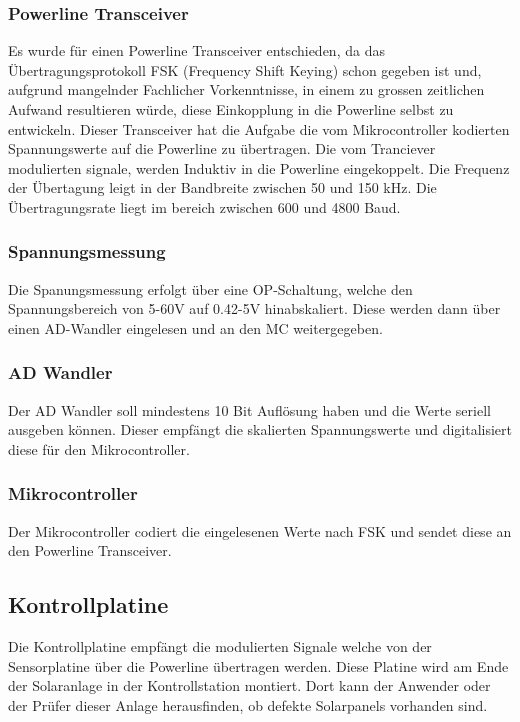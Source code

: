\newpage
\subsubsection{Powerline Transceiver}

Es wurde für einen Powerline Transceiver entschieden, da das Übertragungsprotokoll FSK (Frequency Shift Keying) schon gegeben ist und, aufgrund mangelnder Fachlicher Vorkenntnisse, in einem zu grossen zeitlichen Aufwand resultieren würde, diese Einkopplung in die Powerline selbst zu entwickeln. 
Dieser Transceiver hat die Aufgabe die vom Mikrocontroller kodierten Spannungswerte auf die Powerline zu übertragen. Die vom Tranciever modulierten signale, werden Induktiv in die Powerline eingekoppelt.  Die Frequenz der Übertagung leigt in der Bandbreite zwischen 50 und 150 kHz. Die Übertragungsrate liegt im bereich zwischen 600 und 4800 Baud.

\subsubsection{Spannungsmessung}

Die Spanungsmessung erfolgt über eine OP-Schaltung, welche den Spannungsbereich von 5-60V auf 0.42-5V hinabskaliert. Diese werden dann über einen AD-Wandler eingelesen und an den MC weitergegeben.

\subsubsection{AD Wandler}

Der AD Wandler soll mindestens 10 Bit Auflösung haben und die Werte seriell ausgeben können. Dieser empfängt die skalierten Spannungswerte und digitalisiert diese für den Mikrocontroller.

\subsubsection{Mikrocontroller}

Der Mikrocontroller codiert die eingelesenen Werte nach FSK und sendet diese an den Powerline Transceiver.

\subsection{Kontrollplatine}

Die Kontrollplatine empfängt die modulierten Signale welche von der Sensorplatine über die Powerline übertragen werden. Diese Platine wird am Ende der Solaranlage in der Kontrollstation montiert. Dort kann der Anwender oder der Prüfer dieser Anlage herausfinden, ob defekte Solarpanels vorhanden sind.

